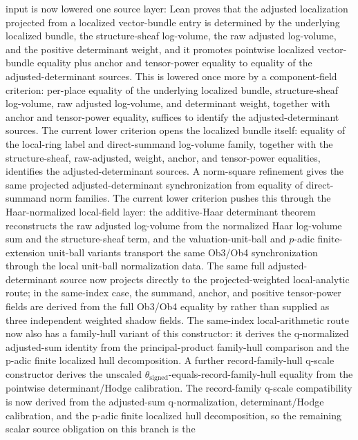\documentclass[11pt]{article}
\theoremstyle{plain}
\theoremstyle{definition}
\theoremstyle{remark}
\begin{document}
input is now lowered one source layer: Lean proves that the adjusted
localization projected from a localized vector-bundle entry is determined by
the underlying localized bundle, the structure-sheaf log-volume, the raw
adjusted log-volume, and the positive determinant weight, and it promotes
pointwise localized vector-bundle equality plus anchor and tensor-power
equality to equality of the adjusted-determinant sources.  This is lowered once
more by a component-field criterion: per-place equality of the underlying
localized bundle, structure-sheaf log-volume, raw adjusted log-volume, and
determinant weight, together with anchor and tensor-power equality, suffices to
identify the adjusted-determinant sources.  The current lower criterion opens
the localized bundle itself: equality of the local-ring label and
direct-summand log-volume family, together with the structure-sheaf,
raw-adjusted, weight, anchor, and tensor-power equalities, identifies the
adjusted-determinant sources.  A norm-square refinement gives the same
projected adjusted-determinant synchronization from equality of direct-summand
norm families.  The current lower criterion pushes this through the
Haar-normalized local-field layer: the additive-Haar determinant theorem
reconstructs the raw adjusted log-volume from the normalized Haar log-volume
sum and the structure-sheaf term, and the valuation-unit-ball and \(p\)-adic
finite-extension unit-ball variants transport the same Ob3/Ob4 synchronization
through the local unit-ball normalization data.  The same
full adjusted-determinant source now projects directly to the
projected-weighted local-analytic route; in the same-index case, the summand,
anchor, and positive tensor-power fields are derived from the full Ob3/Ob4
equality by
\texttt{}
rather than supplied as three independent weighted shadow fields.
The same-index local-arithmetic route now also has a family-hull variant of
this constructor: it derives the q-normalized adjusted-sum identity from the
principal-product family-hull comparison and the p-adic finite localized hull
decomposition.  A further record-family-hull q-scale constructor derives the
unscaled \(\theta_{\mathrm{signed}}\)-equals-record-family-hull equality from
the pointwise determinant/Hodge calibration.  The record-family q-scale
compatibility is now derived from the adjusted-sum q-normalization,
determinant/Hodge calibration, and the p-adic finite localized hull
decomposition, so the remaining scalar source obligation on this branch is the
\end{document}
